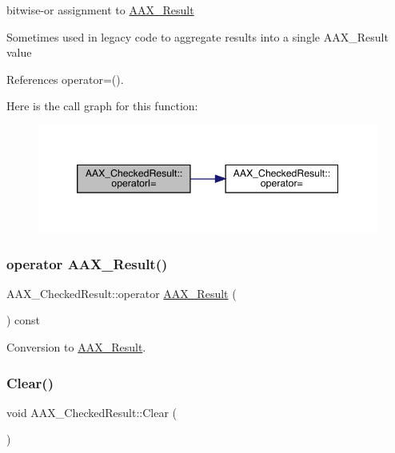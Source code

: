 bitwise-\/or assignment to \mbox{\hyperlink{a00392_a4d8f69a697df7f70c3a8e9b8ee130d2f}{A\+A\+X\+\_\+\+Result}} 

Sometimes used in legacy code to aggregate results into a single A\+A\+X\+\_\+\+Result value 

References operator=().

Here is the call graph for this function\+:
\nopagebreak
\begin{figure}[H]
\begin{center}
\leavevmode
\includegraphics[width=346pt]{a01601_a5be1639dbab20f74265dfad8685e7f9f_cgraph}
\end{center}
\end{figure}
\mbox{\label{a01601_a3f35266c39cfcf4211dbaacbf64fc3f8}} 
\subsubsection{\texorpdfstring{operator AAX\_Result()}{operator AAX\_Result()}}
{\footnotesize\ttfamily A\+A\+X\+\_\+\+Checked\+Result\+::operator \mbox{\hyperlink{a00392_a4d8f69a697df7f70c3a8e9b8ee130d2f}{A\+A\+X\+\_\+\+Result}} (\begin{DoxyParamCaption}{ }\end{DoxyParamCaption}) const\hspace{0.3cm}{\ttfamily [inline]}}



Conversion to \mbox{\hyperlink{a00392_a4d8f69a697df7f70c3a8e9b8ee130d2f}{A\+A\+X\+\_\+\+Result}}. 

\mbox{\label{a01601_abacea9ed08e64315cb984fa630815dd7}} 
\subsubsection{\texorpdfstring{Clear()}{Clear()}}
{\footnotesize\ttfamily void A\+A\+X\+\_\+\+Checked\+Result\+::\+Clear (\begin{DoxyParamCaption}{ }\end{DoxyParamCaption})\hspace{0.3cm}{\ttfamily [inline]}}



